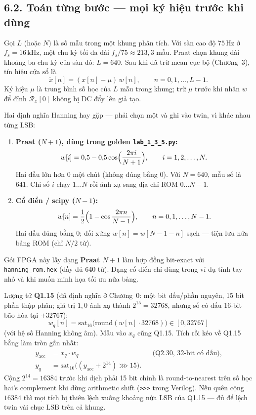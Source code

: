 \subsection*{6.2. Toán từng bước --- mọi ký hiệu trước khi dùng}

Gọi $L$ (hoặc $N$) là số mẫu trong một khung phân tích. Với sàn cao độ $75\,\text{Hz}$ ở $f_s = 16\,\text{kHz}$, một chu kỳ tối đa dài $f_s/75 \approx 213{,}3$ mẫu. Praat chọn khung dài khoảng ba chu kỳ của sàn đó: $L = 640$. Sau khi đã trừ mean cục bộ (Chương~3), tín hiệu cửa sổ là
\[
\tilde{x}[n] = (x[n] - \mu)\, w[n], \qquad n = 0,1,\ldots,L-1.
\]
Ký hiệu $\mu$ là trung bình số học của $L$ mẫu trong khung; trừ $\mu$ trước khi nhân $w$ để đỉnh $\mathcal{R}_x[0]$ không bị DC đẩy lên giả tạo.

Hai định nghĩa Hanning hay gặp --- phải chọn một và ghi vào twin, vì khác nhau từng LSB:

\begin{enumerate}[leftmargin=1.4em]
\item \textbf{Praat ($N{+}1$), dùng trong golden \texttt{lab\_1\_3\_5.py}:}
\[
w[i] = 0{,}5 - 0{,}5\cos\Bigl(\frac{2\pi i}{N+1}\Bigr), \qquad i = 1,2,\ldots,N.
\]
Hai đầu lớn hơn 0 một chút (không đúng bằng 0). Với $N = 640$, mẫu số là $641$. Chỉ số $i$ chạy $1\ldots N$ rồi ánh xạ sang địa chỉ ROM $0\ldots N-1$.
\item \textbf{Cổ điển / scipy ($N{-}1$):}
\[
w[n] = \frac12\Bigl(1 - \cos\frac{2\pi n}{N-1}\Bigr), \qquad n = 0,1,\ldots,N-1.
\]
Hai đầu đúng bằng 0; đối xứng $w[n] = w[N-1-n]$ sạch --- tiện lưu nửa bảng ROM (chỉ $N/2$ từ).
\end{enumerate}

Gói FPGA này lấy dạng \textbf{Praat $N{+}1$} làm hợp đồng bit-exact với \texttt{hanning\_rom.hex} (đầy đủ 640 từ). Dạng cổ điển chỉ dùng trong ví dụ tính tay nhỏ và khi muốn minh họa tối ưu nửa bảng.

Lượng tử \textbf{Q1.15} (đã định nghĩa ở Chương~0: một bit dấu/phần nguyên, 15 bit phần thập phân; giá trị $1{,}0$ ánh xạ thành $2^{15} = 32768$, nhưng số có dấu 16-bit bão hòa tại $+32767$):
\[
w_q[n] = \mathrm{sat}_{16}\!\bigl(\mathrm{round}(w[n]\cdot 32768)\bigr) \in [0,32767]
\]
(với hệ số Hanning không âm). Mẫu vào $x_q$ cũng Q1.15. Tích rồi kéo về Q1.15 bằng làm tròn gần nhất:
\begin{align*}
y_{\mathrm{acc}} &= x_q \cdot w_q &&\text{(Q2.30, 32-bit có dấu)},\\
y_q &= \mathrm{sat}_{16}\!\bigl((y_{\mathrm{acc}} + 2^{14}) \ggg 15\bigr).
\end{align*}
Cộng $2^{14} = 16384$ trước khi dịch phải 15 bit chính là round-to-nearest trên số học hai's complement khi dùng arithmetic shift (\texttt{>>>} trong Verilog). Nếu quên cộng $16384$ thì mọi tích bị thiên lệch xuống khoảng nửa LSB của Q1.15 --- đủ để lệch twin vài chục LSB trên cả khung.

